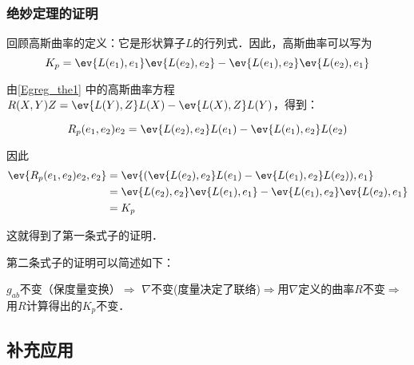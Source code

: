 \subsubsection{绝妙定理的证明}

回顾高斯曲率的定义：它是形状算子$L$的行列式．因此，高斯曲率可以写为
\begin{equation}
K_p=\ev{L(e_1), e_1}\ev{L(e_2), e_2}-\ev{L(e_1), e_2}\ev{L(e_2), e_1}
\end{equation}

由\autoref{Egreg_the1} 中的高斯曲率方程$R(X, Y)Z=\ev{L(Y), Z}L(X)-\ev{L(X), Z}L(Y)$，得到：

\begin{equation}
R_p(e_1, e_2)e_2=\ev{L(e_2), e_2}L(e_1)-\ev{L(e_1), e_2}L(e_2)
\end{equation}

因此
\begin{equation}
\begin{aligned}
\ev{R_p(e_1, e_2)e_2, e_2}&=\ev{(\ev{L(e_2), e_2}L(e_1)-\ev{L(e_1), e_2}L(e_2)), e_1}\\
&=\ev{L(e_2), e_2}\ev{L(e_1), e_1}-\ev{L(e_1), e_2}\ev{L(e_2), e_1}\\
&=K_p
\end{aligned}
\end{equation}

这就得到了第一条式子的证明．

第二条式子的证明可以简述如下：

$g_{ab}$不变（保度量变换）$\Rightarrow$ $\nabla$不变(度量决定了联络)$\Rightarrow$用$\nabla$定义的曲率$R$不变$\Rightarrow$用$R$计算得出的$K_p$不变．



\subsection{补充应用}



